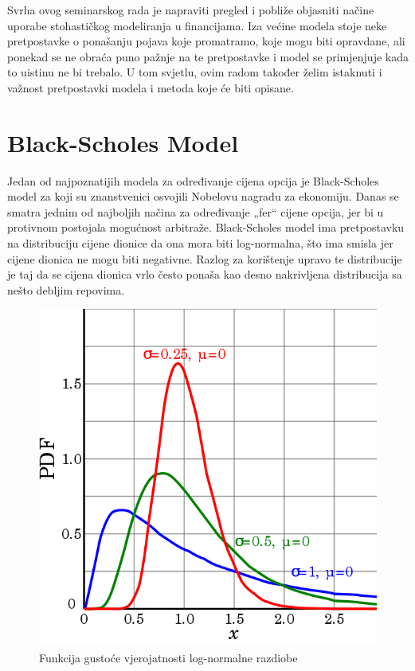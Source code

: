 \documentclass[times, utf8, seminar]{fer}
\begin{document}
Svrha ovog seminarskog rada je napraviti pregled i pobliže objasniti načine uporabe stohastičkog modeliranja u financijama. Iza većine modela stoje neke pretpostavke o ponašanju pojava koje promatramo, koje mogu biti opravdane, ali ponekad se ne obraća puno pažnje na te pretpostavke i model se primjenjuje kada to uistinu ne bi trebalo. U tom svjetlu, ovim radom također želim istaknuti i važnost pretpostavki modela i metoda koje će biti opisane.

\chapter{Black-Scholes Model}

Jedan od najpoznatijih modela za određivanje cijena opcija je Black-Scholes model za koji su znanstvenici osvojili Nobelovu nagradu za ekonomiju. Danas se smatra jednim od najboljih načina za određivanje „fer“ cijene opcija, jer bi u protivnom postojala mogućnost arbitraže. Black-Scholes model ima pretpostavku na distribuciju cijene dionice da ona mora biti log-normalna, što ima smisla jer cijene dionica ne mogu biti negativne. Razlog za korištenje upravo te distribucije je taj da se cijena dionica vrlo često ponaša kao desno nakrivljena distribucija sa nešto debljim repovima.

\begin{figure}[h!]
\centering
\includegraphics[scale=0.4]{img/log_normal_pdf.png}
\caption{Funkcija gustoće vjerojatnosti log-normalne razdiobe}
\label{fig:log_normal_pdf}
\end{figure}
\end{document}
